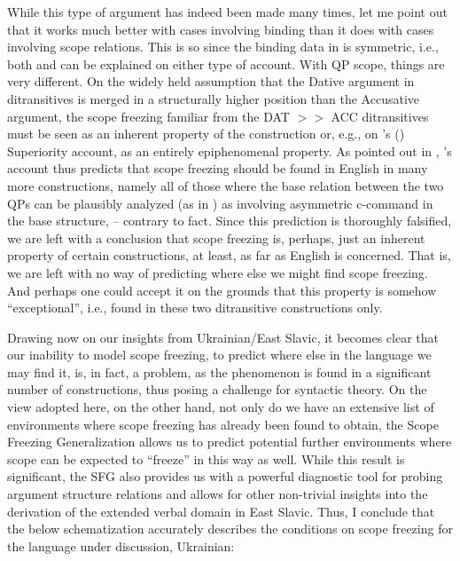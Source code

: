 \documentclass[output=paper,colorlinks,citecolor=brown]{langscibook}
\begin{document}
While this type of argument has indeed been made many times, let me point out that it works much better with cases involving binding than it does with cases involving scope relations. This is so since the binding data in  is symmetric, i.e., both  and  can be explained on either type of account. With QP scope, things are very different. On the widely held assumption that the Dative argument in ditransitives is merged in a structurally higher position than the Accusative argument, the scope freezing familiar from the DAT $>>$ ACC ditransitives must be seen as an inherent property of the construction or, e.g., on \citeauthor{Bruening2001}'s (\citeyear{Bruening2001}) Superiority account, as an entirely epiphenomenal property. As pointed out in \citet{LarsonEtAl2019}, \citeauthor{Bruening2001}’s account thus predicts that scope freezing should be found in English in many more constructions, namely all of those where the base relation between the two QPs can be plausibly analyzed (as in \citealt{Bruening2001}) as involving asymmetric c-command in the base structure, -- contrary to fact. Since this prediction is thoroughly falsified, we are left with a conclusion that scope freezing is, perhaps, just an inherent property of certain constructions, at least, as far as English is concerned. That is, we are left with no way of predicting where else we might find scope freezing. And perhaps one could accept it on the grounds that this property is somehow “exceptional”, i.e., found in these two ditransitive constructions only. 

Drawing now on our insights from Ukrainian/East Slavic, it becomes clear that our inability to model scope freezing, to predict where else in the language we may find it, is, in fact, a problem, as the phenomenon is found in a significant number of constructions, thus posing a challenge for syntactic theory. On the view adopted here, on the other hand, not only do we have an extensive list of environments where scope freezing has already been found to obtain, the Scope Freezing Generalization allows us to predict potential further environments where scope can be expected to ``freeze'' in this way as well. While this result is significant, the SFG also provides us with a powerful diagnostic tool for probing argument structure relations and allows for other non-trivial insights into the derivation of the extended verbal domain in East Slavic. Thus, I conclude that the below schematization accurately describes the conditions on scope freezing for the language under discussion, Ukrainian:
\end{document}
